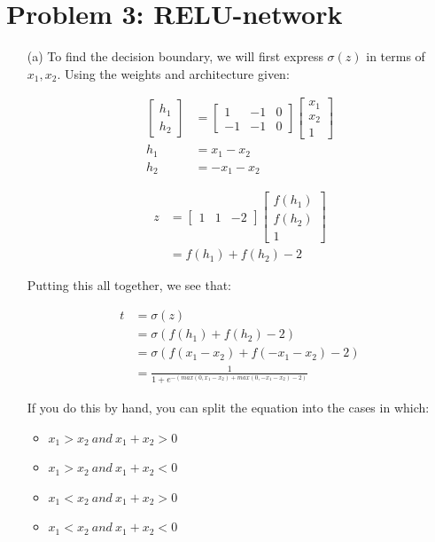 \documentclass{article}
\begin{document}
\section*{Problem 3: RELU-network}
    \begin{enumerate}
        \item[(a)] To find the decision boundary, we will first express $\sigma(z)$ in terms of $x_1, x_2$. Using the weights and architecture given:

    \begin{align*}
        \begin{bmatrix} h_1 \\ h_2 \end{bmatrix} &= \begin{bmatrix} 1 & -1 & 0 \\ -1 & -1 & 0 \end{bmatrix} \begin{bmatrix} x_1 \\ x_2 \\ 1\end{bmatrix} \\
        h_1 &= x_1 - x_2 \\
        h_2 &= -x_1 - x_2
    \end{align*}

    \begin{align*}
        z &= \begin{bmatrix} 1 & 1 & -2 \end{bmatrix} \begin{bmatrix} f(h_1) \\ f(h_2) \\ 1 \end{bmatrix} \\
        &= f(h_1) +  f(h_2) - 2
    \end{align*}

    Putting this all together, we see that:

    \begin{align*}
        t &= \sigma(z) \\
        &= \sigma(f(h_1) + f(h_2) -2)\\
        &= \sigma(f(x_1 - x_2) + f(-x_1 - x_2) - 2) \\
        &= \frac{1}{1+e^{-(max(0, x_1 - x_2) + max(0, -x_1 - x_2) - 2)}}
    \end{align*}

    If you do this by hand, you can split the equation into the cases in which:
    \begin{itemize}
        \item $x_1 > x_2 ~ and ~ x_1 + x_2 > 0$
        \item $x_1 > x_2 ~ and ~ x_1 + x_2 < 0$
        \item $x_1 < x_2 ~ and ~ x_1 + x_2 > 0$
        \item $x_1 < x_2 ~ and ~ x_1 + x_2 < 0$
    \end{itemize}


\end{enumerate}
\end{document}
